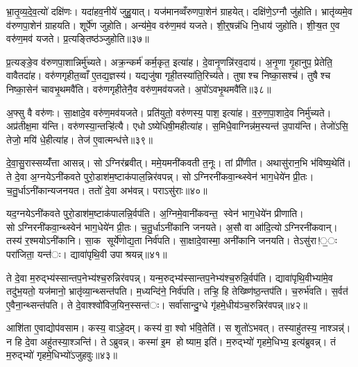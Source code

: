 भ्रा॒तृ॒व्य॒दे॒व॒त्यो॑ दक्षि॑णः। यदा॑हव॒नीये॑ जुहु॒यात्। यज॑मानव्वँरुणपा॒शेन॑ ग्राहयेत्। दक्षि॑णे॒ऽग्नौ जु॑होति। भ्रातृ॑व्यमे॒व व॑रुणपा॒शेन॑ ग्राहयति। शूर्पे॑ण जुहोति। अन्य॑मे॒व वरु॑ण॒मव॑ यजते। शी॒र्॒षन्न॑धि नि॒धाय॑ जुहोति। शी॒ऱ्ष॒त ए॒व वरु॑ण॒मव॑ यजते। प्र॒त्यङ्तिष्ठ॑ञ्जुहोति॥३७॥

प्र॒त्यङ्ङे॒व व॑रुणपा॒शान्निर्मु॑च्यते। अक्र॒न्कर्म॑ कर्म॒कृत॒ इत्या॑ह। दे॒वानृ॒णन्नि॑रव॒दाय॑। अ॒नृ॒णा गृ॒हानुप॒ प्रेतेति॒ वावैतदा॑ह। वरु॑णगृहीत॒व्वाँ ए॒तद्य॒ज्ञस्य॑। यद्यजु॑षा गृही॒तस्या॑ति॒रिच्य॑ते। तुषाश्च निष्का॒सश्च॑। तुषैश्च निष्का॒सेन॑ चावभृ॒थमवै॑ति। वरु॑णगृहीतेनै॒व वरु॑ण॒मव॑यजते। अ॒पो॑ऽवभृ॒थमवै॑ति॥३८॥

अ॒फ्सु वै वरु॑णः। सा॒क्षादे॒व वरु॑ण॒मव॑यजते। प्रति॑युतो॒ वरु॑णस्य॒ पाश॒ इत्या॑ह। व॒रु॒ण॒पा॒शादे॒व निर्मु॑च्यते। अप्र॑तीक्ष॒मा य॑न्ति। वरु॑णस्या॒न्तऱ्हि॑त्यै। एधोऽष्येधिषी॒महीत्या॑ह। स॒मिधै॒वाग्निन्न॑म॒स्यन्त॑ उ॒पाय॑न्ति। तेजो॑ऽसि॒ तेजो॒ मयि॑ धे॒हीत्या॑ह। तेज॑ ए॒वात्मन्ध॑त्ते॥३९॥


दे॒वा॒सु॒रास्सय्यँ॑त्ता आसन्न्। सोऽग्निर॑ब्रवीत्। ममे॒यमनी॑कवती त॒नूः। तां प्री॑णीत। अथासु॑रान॒भि भ॑विष्य॒थेति॑। ते दे॒वा अ॒ग्नयेऽनी॑कवते पुरो॒डाश॑म॒ष्टाक॑पाल॒न्निर॑वपन्न्। सोऽग्निरनी॑कवा॒न्थ्स्वेन॑ भाग॒धेये॑न प्री॒तः। च॒तु॒र्धाऽनी॑कान्यजनयत। ततो॑ दे॒वा अभ॑वन्न्। पराऽसु॑राः॥४०॥

यद॒ग्नयेऽनी॑कवते पुरो॒डाश॑म॒ष्टाक॑पालन्नि॒र्वप॑ति। अ॒ग्निमे॒वानी॑कवन्त॒ स्वेन॑ भाग॒धेये॑न प्रीणाति। सोऽग्निरनी॑कवा॒न्थ्स्वेन॑ भाग॒धेये॑न प्री॒तः। च॒तु॒र्धाऽनी॑कानि जनयते। अ॒सौ वा आ॑दि॒त्योऽग्निरनी॑कवान्। तस्य॑ र॒श्मयोऽनी॑कानि। सा॒क सूर्ये॑णोद्य॒ता निर्व॑पति। सा॒क्षादे॒वास्मा॒ अनी॑कानि जनयति। तेऽसु॑रा!॒ः परा॑जिता॒ यन्त॑ः। द्यावा॑पृथि॒वी उपाश्रयन्न्॥४१॥

ते दे॒वा म॒रुद्भ्य॑स्सान्तप॒नेभ्य॑श्च॒रुन्निर॑वपन्न्। यन्म॒रुद्भ्य॑स्सान्तप॒नेभ्य॑श्च॒रुन्नि॒र्वप॑ति। द्यावा॑पृथि॒वीभ्या॑मे॒व तदु॑भ॒यतो॒ यज॑मानो॒ भ्रातृ॑व्या॒न्थ्सन्त॑पति। म॒ध्यन्दि॑ने॒ निर्व॑पति। तऱ्हि॒ हि तेख्ष्णि॑ष्ठ॒न्तप॑ति। च॒रुर्भ॑वति। स॒र्वत॑ ए॒वैना॒न्थ्सन्त॑पति। ते दे॒वाश्श्वो॑विज॒यिन॒स्सन्त॑ः। सर्वा॑सान्दु॒ग्धे गृ॑हमे॒धीय॑ञ्च॒रुन्निर॑वपन्न्॥४२॥

आशि॑ता ए॒वाद्योप॑वसाम। कस्य॒ वाऽहे॒दम्। कस्य॑ वा॒ श्वो भ॑वि॒तेति॑। स शृ॒तो॑ऽभवत्। तस्याहु॑तस्य॒ नाश्ञन्न्॑। न हि दे॒वा अहु॑तस्या॒श्ञन्ति॑। तेऽब्रुवन्न्। कस्मा॑ इ॒म होष्याम॒ इति॑। म॒रुद्भ्यो॑ गृहमे॒धिभ्य॒ इत्य॑ब्रुवन्न्। तं म॒रुद्भ्यो॑ गृहमे॒धिभ्यो॑ऽजुहवुः॥४३॥


